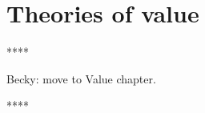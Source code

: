 %
%
%


\section{Theories of value}
\label{sec:theory_of_value}

****

Becky: move to Value chapter.

****

